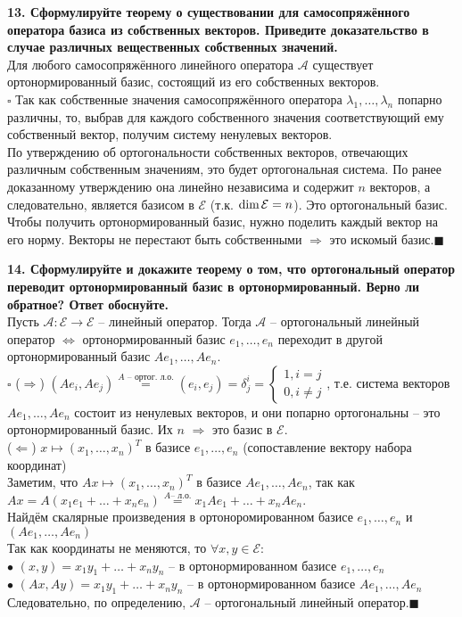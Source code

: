 \documentclass[11pt,a4paper]{article}
\newcommand{\A}{\mathcal{A}}
\newcommand{\E}{\mathcal{E}}
\newcommand{\Dim}[1]{\mathrm{dim}\hspace{0.5mm}#1}
\newcommand{\proof}{$\square$ }
\newcommand{\qed}{\hfill$\blacksquare$}
\begin{document}
\textbf{13. Сформулируйте теорему о существовании для самосопряжённого оператора базиса из собственных векторов. Приведите доказательство в случае различных вещественных собственных значений.\\}
Для любого самосопряжённого линейного оператора $\A$ существует ортонормированный базис, состоящий из его собственных векторов.\\
\proof Так как собственные значения самосопряжённого оператора $\lambda_1, \hdots, \lambda_n$ попарно различны, то, выбрав для каждого собственного значения соответствующий ему собственный вектор, получим систему ненулевых векторов.\\
По утверждению об ортогональности собственных векторов, отвечающих различным собственным значениям, это будет ортогональная система. По ранее доказанному утверждению она линейно независима и содержит $n$ векторов, а следовательно, является базисом в $\E$ (т.к. $\Dim{\E} = n$). Это ортогональный базис. Чтобы получить ортонормированный базис, нужно поделить каждый вектор на его норму. Векторы не перестают быть собственными $\Rightarrow$ это искомый базис.\qed

\textbf{14. Сформулируйте и докажите теорему о том, что ортогональный оператор переводит ортонормированный базис в ортонормированный. Верно ли обратное? Ответ обоснуйте.\\}
Пусть $\A : \E \rightarrow \E$ -- линейный оператор. Тогда $\A$ -- ортогональный линейный оператор $\Leftrightarrow$ ортонормированный базис $e_1, \hdots, e_n$ переходит в другой ортонормированный базис $Ae_1, \hdots, Ae_n$.\\
\proof ($\Rightarrow$) $(Ae_i, Ae_j) \stackrel{A \text{ -- ортог. л.о.}}{=} (e_i, e_j) = \delta_j^i = \begin{cases}
1, i = j \\
0, i \neq j
\end{cases}$, т.е. система векторов $Ae_1, \hdots, Ae_n$ состоит из ненулевых векторов, и они попарно ортогональны -- это ортонормированный базис. Их $n$ $\Rightarrow$ это базис в $\E$.\\
($\Leftarrow$) $x \mapsto (x_1, \hdots, x_n)^T$ в базисе $e_1, \hdots, e_n$ (сопоставление вектору набора координат)\\
Заметим, что $Ax \mapsto (x_1, \hdots, x_n)^T$ в базисе $Ae_1, \hdots, Ae_n$, так как $Ax = A(x_1 e_1 + \hdots + x_n e_n) \stackrel{A \text{-- л.о.}}{=} x_1 Ae_1 + \hdots + x_n Ae_n$.\\
Найдём скалярные произведения в ортоноромированном базисе $e_1, \hdots, e_n$ и $(Ae_1, \hdots, Ae_n)$\\
Так как координаты не меняются, то $\forall x, y \in \E:$\\
$\bullet$ $(x, y) = x_1 y_1 + \hdots + x_n y_n$ -- в ортонормированном базисе $e_1, \hdots, e_n$\\
$\bullet$ $(Ax, Ay) = x_1 y_1 + \hdots + x_n y_n$ -- в ортонормированном базисе $Ae_1, \hdots, Ae_n$\\
Следовательно, по определению, $\A$ -- ортогональный линейный оператор.\qed
\end{document}

